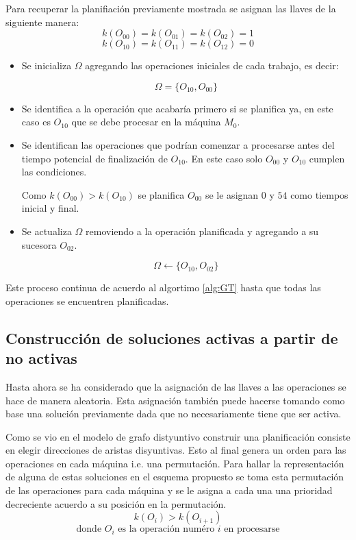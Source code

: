 Para recuperar la planifiación previamente mostrada se asignan las llaves de la siguiente manera: \[k(O_{00})=k(O_{01})=k(O_{02})=1\]  \[k(O_{10})=k(O_{11})=k(O_{12})=0\]
\begin{itemize}
    \item Se inicializa $\Omega$ agregando las operaciones iniciales de cada trabajo, es decir:

\[\Omega = \{O_{10},O_{00}\}\]

     \item Se identifica a la operación que acabaría primero si se planifica ya, en este caso es $O_{10}$ que se debe procesar en la máquina $M_0$. 

     \item Se identifican las operaciones que podrían comenzar a procesarse antes del tiempo potencial de finalización de $O_{10}$. En este caso solo $O_{00}$ y  $O_{10}$ cumplen las condiciones.

Como $k(O_{00})>k(O_{10})$ se planifica $O_{00}$ se le asignan $0$ y $54$ como tiempos inicial y final.

     \item Se actualiza $\Omega$ removiendo a la operación planificada y agregando a su sucesora $O_{02}$.

\[\Omega\leftarrow \{O_{10},O_{02}\}\]
\end{itemize}
Este proceso continua de acuerdo al algortimo \ref{alg:GT} hasta que todas las operaciones se encuentren planificadas.\\ 

\subsection{Construcción de soluciones activas a partir de no activas}

Hasta ahora se ha considerado que la asignación de las llaves a las operaciones se hace de manera aleatoria. Esta asignación también puede hacerse tomando como base una solución previamente dada que no necesariamente tiene que ser activa. 

Como se vio en el modelo de grafo distyuntivo construir una planificación consiste en elegir direcciones de aristas disyuntivas. Esto al final genera un orden para las operaciones en cada máquina i.e. una permutación. Para hallar la representación de alguna de estas soluciones en el esquema propuesto se toma esta permutación de las operaciones para cada máquina y se le asigna a cada una una prioridad decreciente acuerdo a su posición en la permutación.
\[k(O_i)>k(O_{i+1})\]
\[\text{donde }O_i\text{ es la operación numéro $i$ en procesarse}\]


